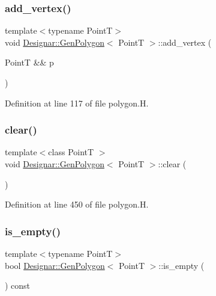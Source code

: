 \subsubsection{\texorpdfstring{add\+\_\+vertex()}{add\_vertex()}\hspace{0.1cm}{\footnotesize\ttfamily [2/2]}}
{\footnotesize\ttfamily template$<$typename PointT$>$ \\
void \hyperlink{class_designar_1_1_gen_polygon}{Designar\+::\+Gen\+Polygon}$<$ PointT $>$\+::add\+\_\+vertex (\begin{DoxyParamCaption}\item[{PointT \&\&}]{p }\end{DoxyParamCaption})\hspace{0.3cm}{\ttfamily [inline]}}



Definition at line 117 of file polygon.\+H.

\mbox{\label{class_designar_1_1_gen_polygon_a1f16b49e951787ee8afff43ae1957a8b}} 
\subsubsection{\texorpdfstring{clear()}{clear()}}
{\footnotesize\ttfamily template$<$class PointT $>$ \\
void \hyperlink{class_designar_1_1_gen_polygon}{Designar\+::\+Gen\+Polygon}$<$ PointT $>$\+::clear (\begin{DoxyParamCaption}{ }\end{DoxyParamCaption})}



Definition at line 450 of file polygon.\+H.

\mbox{\label{class_designar_1_1_gen_polygon_a71494c73881d1281048a24d4d75b67f1}} 
\subsubsection{\texorpdfstring{is\+\_\+empty()}{is\_empty()}}
{\footnotesize\ttfamily template$<$typename PointT$>$ \\
bool \hyperlink{class_designar_1_1_gen_polygon}{Designar\+::\+Gen\+Polygon}$<$ PointT $>$\+::is\+\_\+empty (\begin{DoxyParamCaption}{ }\end{DoxyParamCaption}) const\hspace{0.3cm}{\ttfamily [inline]}}



